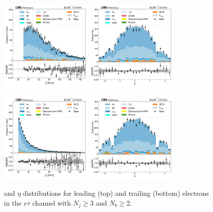 \begin{figure}[htb!]
    \centering
    \includegraphics[width=0.4\textwidth]{chapters/Analysis/sectionPlots/figures/data_mc_overlays/etau_2016_cat_gt3_gt2_signal_linear_lepton_lepton1_pt}
    \includegraphics[width=0.4\textwidth]{chapters/Analysis/sectionPlots/figures/data_mc_overlays/etau_2016_cat_gt3_gt2_signal_linear_lepton_lepton1_eta}

    \includegraphics[width=0.4\textwidth]{chapters/Analysis/sectionPlots/figures/data_mc_overlays/etau_2016_cat_gt3_gt2_signal_linear_lepton_lepton2_pt}
    \includegraphics[width=0.4\textwidth]{chapters/Analysis/sectionPlots/figures/data_mc_overlays/etau_2016_cat_gt3_gt2_signal_linear_lepton_lepton2_eta}
    \caption{\pt and $\eta$ distributions for leading (top) and trailing
        (bottom) electrons in the $e\tau$ channel with $N_{j} \geq 3$ and
        $N_{b} \geq 2$.}
    \label{fig:analysis:plots:etau_8_kinematic}
\end{figure}

